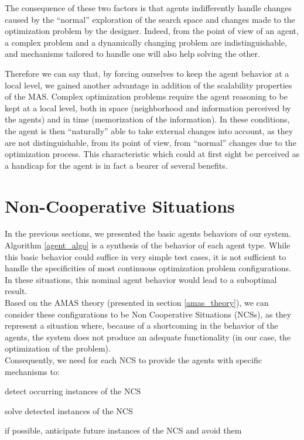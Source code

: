 The consequence of these two factors is that agents indifferently handle changes caused by the \enquote{normal} exploration of the search space and changes made to the optimization problem by the designer. Indeed, from the point of view of an agent, a complex problem and a dynamically changing problem are indistinguishable, and mechanisms tailored to handle one will also help solving the other.

Therefore we can say that, by forcing ourselves to keep the agent behavior at a local level, we gained another advantage in addition of the scalability properties of the MAS. Complex optimization problems require the agent reasoning to be kept at a local level, both in space (neighborhood and information perceived by the agents) and in time (memorization of the information). In these conditions, the agent is then \enquote{naturally} able to take external changes into account, as they are not distinguishable, from its point of view, from \enquote{normal} changes due to the optimization process. This characteristic which could at first sight be perceived as a handicap for the agent is in fact a bearer of several benefits.

\section{Non-Cooperative Situations}\label{NCS_pres}

In the previous sections, we presented the basic agents behaviors of our system. Algorithm \ref{agent_algo} is a synthesis of the behavior of each agent type. While this basic behavior could suffice in very simple test cases, it is not sufficient to handle the specificities of most continuous optimization problem configurations. In these situations, this nominal agent behavior would lead to a suboptimal result.\\
Based on the AMAS theory (presented in section \ref{amas_theory}), we can consider these configurations to be Non Cooperative Situations (NCSs), as they represent a situation where, because of a shortcoming in the behavior of the agents, the system does not produce an adequate functionality (in our case, the optimization of the problem).\\
Consequently, we need for each NCS to provide the agents with specific mechanisms to:
\begin{compactenum}
\item detect occurring instances of the NCS
\item solve detected instances of the NCS
\item if possible, anticipate future instances of the NCS and avoid them
\end{compactenum}


